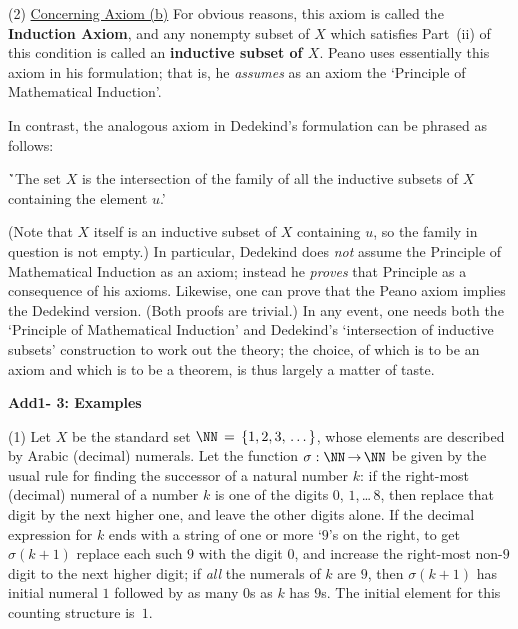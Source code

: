 {\V

        (2) \underline{Concerning Axiom (b)} For obvious reasons, this axiom is called the {\bf Induction Axiom},
    and any nonempty subset of $X$ which satisfies Part~(ii) of this condition is called an {\bf inductive subset of $X$}.
    Peano uses essentially this axiom in his formulation; that is, he {\em assumes} as an axiom the `Principle of Mathematical Induction'.

        In contrast, the analogous axiom in Dedekind's formulation can be phrased as follows:

        \h `The set $X$ is the intersection of the family of all the inductive subsets of $X$ containing the element $u$.'

\noindent (Note that $X$ itself is an inductive subset of $X$ containing $u$, so the family in question is not empty.)
    In particular, Dedekind does {\em not} assume the Principle of Mathematical Induction as an axiom;
    instead he {\em proves} that Principle as a consequence of his axioms.
    Likewise, one can prove that the Peano axiom implies the Dedekind version. (Both proofs are trivial.)
    In any event, one needs both the `Principle of Mathematical Induction' and Dedekind's `intersection of inductive subsets' construction to work out the theory;
    the choice, of which is to be an axiom and which is to be a theorem, is thus largely a matter of taste.

\V
\V

        {\bf Add1- 3: Examples}

\V

        (1) Let $X$ be the standard set ${\NN} \,=\, \{1,2,3,\,{\ldots}\,\}$, whose elements are described by Arabic (decimal) numerals.
    Let the function ${\sigma}:{\NN} \,{\rightarrow}\, {\NN}$ be given by the usual rule for finding the successor of a natural number $k$:
    if the right-most (decimal) numeral of a number $k$ is one of the digits $0$, $1$,\,{\ldots}\,$8$, then replace that digit by the next higher one,
    and leave the other digits alone.
    If the decimal expression for $k$ ends with a string of one or more `$9$'s on the right, to get ${\sigma}(k+1)$ replace each such $9$ with the digit $0$,
    and increase the right-most non-$9$ digit to the next higher digit; if {\em all} the numerals of $k$ are $9$,
    then ${\sigma}(k+1)$ has initial numeral $1$ followed by as many $0$s as $k$ has $9$s.
    The initial element for this counting structure is~$1$.

}
